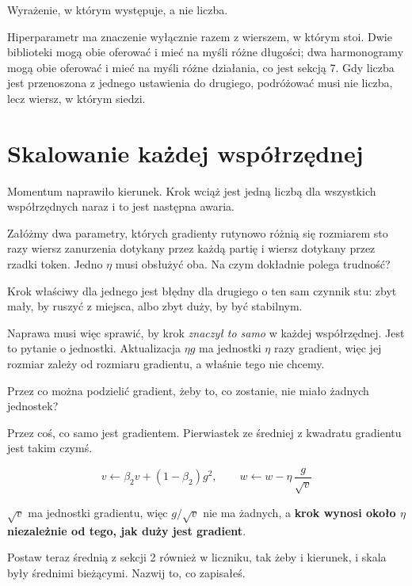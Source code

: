 \begin{fr}
\begin{ansblock}
Wyrażenie, w którym występuje, a nie liczba.
\end{ansblock}

Hiperparametr ma znaczenie wyłącznie razem z wierszem, w którym stoi. Dwie
biblioteki mogą obie oferować  i mieć na myśli różne
długości; dwa harmonogramy mogą obie oferować  i mieć na myśli różne
działania, co jest sekcją 7. Gdy liczba jest przenoszona z jednego ustawienia
do drugiego, podróżować musi nie liczba, lecz wiersz, w którym siedzi.
\end{fr}

\section{Skalowanie każdej współrzędnej}
\label{sec:P20-adaptive}

\begin{fr}
Momentum naprawiło kierunek. Krok wciąż jest jedną liczbą dla wszystkich
współrzędnych naraz i to jest następna awaria.

Załóżmy dwa parametry, których gradienty rutynowo różnią się rozmiarem sto razy
\dash{} wiersz zanurzenia dotykany przez każdą partię i wiersz dotykany przez
rzadki token. Jedno $\eta$ musi obsłużyć oba. Na czym dokładnie polega
trudność?
\dotline
\nextframe
\end{fr}

\begin{fr}
\begin{ansblock}
Krok właściwy dla jednego jest błędny dla drugiego o ten sam czynnik stu: zbyt
mały, by ruszyć z miejsca, albo zbyt duży, by być stabilnym.
\end{ansblock}

Naprawa musi więc sprawić, by krok \emph{znaczył to samo} w każdej
współrzędnej. Jest to pytanie o jednostki. Aktualizacja $\eta g$ ma jednostki
$\eta$ razy gradient, więc jej rozmiar zależy od rozmiaru gradientu, a właśnie
tego nie chcemy.

Przez co można podzielić gradient, żeby to, co zostanie, nie miało żadnych
jednostek?
\nextframe
\end{fr}

\begin{fr}
\begin{ansblock}
Przez coś, co samo jest gradientem. Pierwiastek ze średniej z kwadratu
gradientu jest takim czymś.
\end{ansblock}

\[ v \leftarrow \beta_2 v + (1-\beta_2) g^{2}, \qquad
   w \leftarrow w - \eta\,\frac{g}{\sqrt{v}} \]

$\sqrt{v}$ ma jednostki gradientu, więc $g/\sqrt{v}$ nie ma żadnych, a
\textbf{krok wynosi około $\eta$ niezależnie od tego, jak duży jest gradient}.

Postaw teraz średnią z sekcji 2 również w liczniku, tak żeby i kierunek, i
skala były średnimi bieżącymi. Nazwij to, co zapisałeś.
\dotline
\nextframe
\end{fr}

